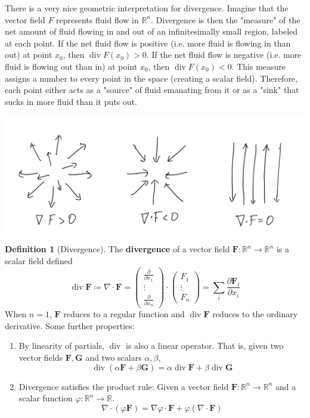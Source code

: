 \documentclass{article}
\DeclareMathOperator{\Div}{div}
\theoremstyle{remark}
\theoremstyle{definition}
\newtheorem{definition}{Definition}[section]
\begin{document}
There is a very nice geometric interpretation for divergence. Imagine that the vector field $F$ represents fluid flow in $\mathbb{R}^n$. Divergence is then the "measure" of the net amount of fluid flowing in and out of an infinitesimally small region, labeled at each point. If the net fluid flow is positive (i.e. more fluid is flowing in than out) at point $x_0$, then $\Div{F}(x_0) > 0$. If the net fluid flow is negative (i.e. more fluid is flowing out than in) at point $x_0$, then $\Div{F}(x_0) < 0$. This measure assigns a number to every point in the space (creating a scalar field). Therefore, each point either acts as a "source" of fluid emanating from it or as a "sink" that sucks in more fluid than it puts out. 
\begin{center}
    \includegraphics[scale=0.25]{img/Divergence_compared_to_Zero.PNG}
\end{center}

\begin{definition}[Divergence]
The \textbf{divergence} of a vector field $\mathbf{F}: \mathbb{R}^n \longrightarrow \mathbb{R}^n$ is a scalar field defined 
\[\Div \mathbf{F} \coloneqq \nabla \cdot \mathbf{F} = \begin{pmatrix} \frac{\partial}{\partial x_1} \\ \vdots \\ \frac{\partial}{\partial x_n} \end{pmatrix} \cdot \begin{pmatrix} F_1 \\ \vdots \\ F_n \end{pmatrix} = \sum_i \frac{\partial \mathbf{F}_i}{\partial x_i}\]
When $n = 1$, $\mathbf{F}$ reduces to a regular function and $\Div \mathbf{F} $ reduces to the ordinary derivative. Some further properties: 
\begin{enumerate}
    \item By linearity of partials, $\Div$ is also a linear operator. That is, given two vector fields $\mathbf{F}, \mathbf{G}$ and two scalars $\alpha, \beta$, 
    \[\Div (\alpha \mathbf{F} + \beta \mathbf{G}) = \alpha \Div \mathbf{F} + \beta \Div \mathbf{G}\]
    
    \item Divergence satisfies the product rule: Given a vector field $\mathbf{F}: \mathbb{R}^n \longrightarrow \mathbb{R}^n$ and a scalar function $\varphi: \mathbb{R}^n \longrightarrow \mathbb{R}$. 
    \[\nabla \cdot (\varphi \mathbf{F}) = \nabla \varphi \cdot \mathbf{F} + \varphi (\nabla \cdot \mathbf{F})\]
\end{enumerate}
\end{definition}
\end{document}
